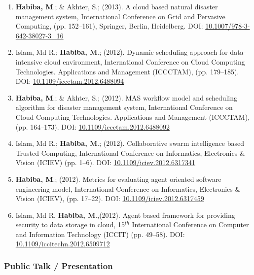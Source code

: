 \documentclass[12pt,]{scrartcl}
\begin{document}
\begin{enumerate}
  \item \textbf{Habiba, M}.; \& Akhter, S.; (2013). A cloud based natural disaster management system, International Conference on Grid and Pervasive Computing, (pp. 152--161), Springer, Berlin, Heidelberg. DOI: \href{https://doi.org/10.1007/978-3-642-38027-3\_16  }{10.1007/978-3-642-38027-3\_16}
   
   \item Islam, Md R.; \textbf{Habiba, M}.; (2012). Dynamic scheduling approach for data-intensive cloud environment, International Conference on Cloud Computing Technologies. Applications and Management (ICCCTAM), (pp. 179--185). DOI: \href{ https://doi.org/10.1109/iccctam.2012.6488094  }{10.1109/iccctam.2012.6488094}
  
  
  \item \textbf{Habiba, M}.; \& Akhter, S.; (2012). MAS workflow model and scheduling algorithm for disaster management system, International Conference on Cloud Computing Technologies. Applications and Management (ICCCTAM), (pp. 164--173). DOI: \href{https://doi.org/10.1109/iccctam.2012.6488092 }{10.1109/iccctam.2012.6488092}

    \item Islam, Md R.; \textbf{Habiba, M}.; (2012). Collaborative swarm intelligence based Trusted Computing, International Conference on Informatics, Electronics \& Vision (ICIEV) (pp. 1--6). DOI: \href{https://doi.org/10.1109/iciev.2012.6317341  }{10.1109/iciev.2012.6317341 }

 \item \textbf{Habiba, M}.; (2012). Metrics for evaluating agent oriented software engineering model, International Conference on Informatics, Electronics \& Vision (ICIEV), (pp. 17--22). DOI: \href{ https://doi.org/10.1109/iciev.2012.6317459 }{10.1109/iciev.2012.6317459 }
 
  \item Islam, Md R. \textbf{Habiba, M}.,(2012). Agent based framework for providing security to data storage in cloud, 15$^{th}$ International Conference on Computer and Information Technology (ICCIT) (pp. 49--58). DOI: \href{https://doi.org/10.1109/iccitechn.2012.6509712 }{10.1109/iccitechn.2012.6509712 }

\end{enumerate}



 \subsubsection{ Public Talk / Presentation}\label{theses-and-dissertations}
\end{document}
